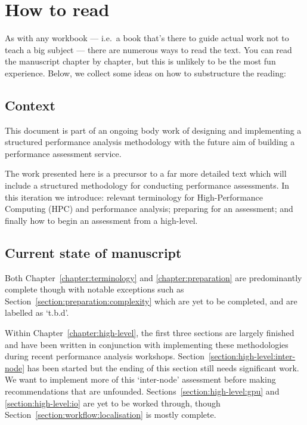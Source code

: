 \chapter{How to read}

As with any workbook --- i.e.~a book that's there to guide actual work not to teach a
big subject --- there are numerous ways to read the text. 
You can read the manuscript chapter by chapter, but this is unlikely to be the
most fun experience.
Below, we collect some ideas on how to substructure the reading:


\section*{Context}

This document is part of an ongoing body work of designing and implementing a structured performance analysis methodology with the future aim of building a performance assessment service.

The work presented here is a precursor to a far more detailed text which will include a structured methodology for conducting performance assessments. In this iteration we introduce: relevant terminology for High-Performance Computing (HPC) and performance analysis; preparing for an assessment; and finally how to begin an assessment from a high-level. 

\section*{Current state of manuscript}

Both Chapter~\ref{chapter:terminology} and \ref{chapter:preparation} are predominantly complete though with notable exceptions such as Section~\ref{section:preparation:complexity} which are yet to be completed, and are labelled as `t.b.d'. 

Within Chapter~\ref{chapter:high-level}, the first three sections are largely finished and have been written in conjunction with implementing these methodologies during recent performance analysis workshops. Section~\ref{section:high-level:inter-node} has been started but the ending of this section still needs significant work. We want to implement more of this `inter-node' assessment before making recommendations that are unfounded. Sections~\ref{section:high-level:gpu} and \ref{section:high-level:io} are yet to be worked through, though Section~\ref{section:workflow:localisation} is mostly complete. 

